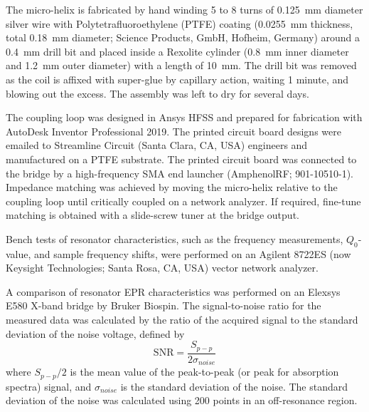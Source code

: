 The micro-helix is fabricated by hand winding 5 to 8 turns of 0.125~mm diameter silver wire with Polytetrafluoroethylene (PTFE) coating (0.0255~mm thickness, total 0.18~mm diameter; Science Products, GmbH, Hofheim, Germany) around a 0.4~mm drill bit and placed inside a Rexolite cylinder (0.8~mm inner diameter and 1.2~mm outer diameter) with a length of 10~mm. The drill bit was removed as the coil is affixed with super-glue by capillary action, waiting 1 minute, and blowing out the excess. The assembly was left to dry for several days. 

The coupling loop was designed in Ansys HFSS and prepared for fabrication with AutoDesk Inventor Professional 2019. The printed circuit board designs were emailed to Streamline Circuit (Santa Clara, CA, USA) engineers and manufactured on a PTFE substrate. The printed circuit board was connected to the bridge by a high-frequency SMA end launcher (AmphenolRF; 901-10510-1). Impedance matching was achieved by moving the micro-helix relative to the coupling loop until critically coupled on a network analyzer. If required, fine-tune matching is obtained with a slide-screw tuner at the bridge output. 

Bench tests of resonator characteristics, such as the frequency measurements, $Q_0$-value, and sample frequency shifts, were performed on an Agilent 8722ES (now Keysight Technologies; Santa Rosa, CA, USA) vector network analyzer.

A comparison of resonator EPR characteristics was performed on an Elexsys E580 X-band bridge by Bruker Biospin. The signal-to-noise ratio for the measured data was calculated by the ratio of the acquired signal to the standard deviation of the noise voltage, defined by
\begin{equation}
 \text{SNR}=\frac{S_{p\!-\!p}}{2\sigma_{noise}}
\end{equation}
where $S_{p\!-\!p}/2$ is the mean value of the peak-to-peak (or peak for absorption spectra) signal, and $\sigma_{noise}$ is the standard deviation of the noise. \cite{schroeder2000astronomical, oppenheim1999discrete} The standard deviation of the noise was calculated using 200 points in an off-resonance region.

